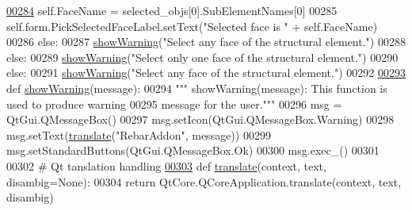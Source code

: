 \begin{DoxyCode}
\hypertarget{Rebarfunc_8py_source.tex_l00284}{}\hyperlink{namespaceRebarfunc_aa191391fe61fc3fff160a228d66910fc}{00284}                 self.FaceName = selected\_objs[0].SubElementNames[0]
00285                 self.form.PickSelectedFaceLabel.setText(\textcolor{stringliteral}{"Selected face is "} + self.FaceName)
00286             \textcolor{keywordflow}{else}:
00287                 \hyperlink{namespaceRebarfunc_a2278a0602d46a62953af1fcf2e574a94}{showWarning}(\textcolor{stringliteral}{"Select any face of the structural element."})
00288         \textcolor{keywordflow}{else}:
00289             \hyperlink{namespaceRebarfunc_a2278a0602d46a62953af1fcf2e574a94}{showWarning}(\textcolor{stringliteral}{"Select only one face of the structural element."})
00290     \textcolor{keywordflow}{else}:
00291         \hyperlink{namespaceRebarfunc_a2278a0602d46a62953af1fcf2e574a94}{showWarning}(\textcolor{stringliteral}{"Select any face of the structural element."})
00292 
\hypertarget{Rebarfunc_8py_source.tex_l00293}{}\hyperlink{namespaceRebarfunc_a2278a0602d46a62953af1fcf2e574a94}{00293} \textcolor{keyword}{def }\hyperlink{namespaceRebarfunc_a2278a0602d46a62953af1fcf2e574a94}{showWarning}(message):
00294     \textcolor{stringliteral}{""" showWarning(message): This function is used to produce warning}
00295 \textcolor{stringliteral}{    message for the user."""}
00296     msg = QtGui.QMessageBox()
00297     msg.setIcon(QtGui.QMessageBox.Warning)
00298     msg.setText(\hyperlink{namespaceRebarfunc_a1467a55852e36c36c472e222855bb937}{translate}(\textcolor{stringliteral}{"RebarAddon"}, message))
00299     msg.setStandardButtons(QtGui.QMessageBox.Ok)
00300     msg.exec\_()
00301 
00302 \textcolor{comment}{# Qt tanslation handling}
\hypertarget{Rebarfunc_8py_source.tex_l00303}{}\hyperlink{namespaceRebarfunc_a1467a55852e36c36c472e222855bb937}{00303} \textcolor{keyword}{def }\hyperlink{namespaceRebarfunc_a1467a55852e36c36c472e222855bb937}{translate}(context, text, disambig=None):
00304     \textcolor{keywordflow}{return} QtCore.QCoreApplication.translate(context, text, disambig)
\end{DoxyCode}
